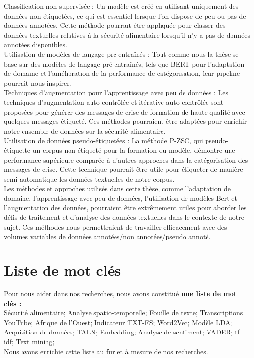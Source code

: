 \documentclass{article}
\begin{document}
Classification non supervisée : Un modèle est créé en utilisant uniquement des données non étiquetées, ce qui est essentiel lorsque l'on dispose de peu ou pas de données annotées. Cette méthode pourrait être appliquée pour classer des données textuelles relatives à la sécurité alimentaire lorsqu'il n'y a pas de données annotées disponibles. \\

Utilisation de modèles de langage pré-entraînés : Tout comme nous la thèse se base sur des modèles de langage pré-entraînés, tels que BERT pour l'adaptation de domaine et l'amélioration de la performance de catégorisation, leur pipeline pourrait nous inspirer. \\

Techniques d'augmentation pour l'apprentissage avec peu de données : Les techniques d'augmentation auto-contrôlée et itérative auto-contrôlée sont proposées pour générer des messages de crise de formation de haute qualité avec quelques messages étiqueté. Ces méthodes pourraient être adaptées pour enrichir notre ensemble de données sur la sécurité alimentaire. \\

Utilisation de données pseudo-étiquetées : La méthode P-ZSC, qui pseudo-étiquette un corpus non étiqueté pour la formation du modèle, démontre une performance supérieure comparée à d'autres approches dans la catégorisation des messages de crise. Cette technique pourrait être utile pour étiqueter de manière semi-automatique les données textuelles de notre corpus. \\

Les méthodes et approches utilisés dans cette thèse, comme l'adaptation de domaine, l'apprentissage avec peu de données, l'utilisation de modèles Bert et l'augmentation des données, pourraient être extrêmement utiles pour aborder les défis de traitement et d'analyse des données textuelles dans le contexte de notre sujet. Ces méthodes nous permettraient de travailler efficacement avec des volumes variables de données annotées/non annotées/pseudo annoté.

\section{Liste de mot clés}

Pour nous aider dans nos recherches, nous avons constitué \textbf{une liste de mot clés :} \\

Sécurité alimentaire; Analyse spatio-temporelle; Fouille de texte; Transcriptions YouTube; Afrique de l'Ouest; Indicateur TXT-FS; Word2Vec; Modèle LDA; Acquisition de données; TALN; Embedding; Analyse de sentiment; VADER; tf-idf; Text mining; \\

Nous avons enrichie cette liste au fur et à mesure de nos recherches. 
\end{document}
